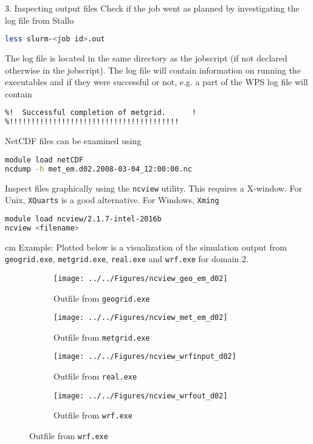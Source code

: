 \documentclass[xcolor=table]{beamer}
\begin{document}
\begin{frame}[fragile, allowframebreaks=.95, t]{3. Inspecting output files}
Check if the job went as planned by investigating the log file from Stallo
\begin{lstlisting}[backgroundcolor = \color{light-gray}, language=bash]
less slurm-<job id>.out
\end{lstlisting}
The log file is located in the same directory as the jobscript (if not declared otherwise in the jobscript). The log file will contain information on running the executables and if they were successful or not, e.g. a part of the WPS log file will contain
\begin{lstlisting}[backgroundcolor = \color{light-gray}, language=bash]
%!!!!!!!!!!!!!!!!!!!!!!!!!!!!!!!!!!!!!!!
%!  Successful completion of metgrid.      !
%!!!!!!!!!!!!!!!!!!!!!!!!!!!!!!!!!!!!!!!
\end{lstlisting}
NetCDF files can be examined using 
\begin{lstlisting}[backgroundcolor = \color{light-gray}, language=bash]
module load netCDF
ncdump -h met_em.d02.2008-03-04_12:00:00.nc
\end{lstlisting}

Inspect files graphically using the \texttt{ncview} utility. This requires a X-window. For Unix, \texttt{XQuarts} is a good alternative. For Windows, \texttt{Xming}
\begin{lstlisting}[backgroundcolor = \color{light-gray}, language=bash]
module load ncview/2.1.7-intel-2016b
ncview <filename>
\end{lstlisting}

 cm
Example: Plotted below is a visualization of the simulation output from \texttt{geogrid.exe}, \texttt{metgrid.exe}, \texttt{real.exe} and \texttt{wrf.exe} for domain 2. 
\begin{figure}[!htb]
	\begin{subfigure}{0.49\textwidth} 
		\centering
		\texttt{[image: ../../Figures/ncview\_geo\_em\_d02]}
		\caption{Outfile from \texttt{geogrid.exe}}
	\end{subfigure}
	\begin{subfigure}{0.49\textwidth}
		\centering
		\texttt{[image: ../../Figures/ncview\_met\_em\_d02]}
		\caption{Outfile from \texttt{metgrid.exe}}
	\end{subfigure}
	\begin{subfigure}{0.49\textwidth} 
		\centering
		\texttt{[image: ../../Figures/ncview\_wrfinput\_d02]}
		\caption{Outfile from \texttt{real.exe}}
	\end{subfigure}
	\begin{subfigure}{0.49\textwidth} 
		\centering
		\texttt{[image: ../../Figures/ncview\_wrfout\_d02]}
		\caption{Outfile from \texttt{wrf.exe}}
	\end{subfigure}
\end{figure}

\end{frame}
\end{document}
